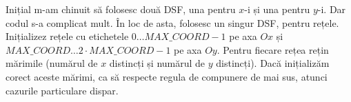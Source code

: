 Inițial m-am chinuit să folosesc două DSF, una pentru $x$-i și una pentru $y$-i. Dar codul s-a complicat mult. În loc de asta, folosesc un singur DSF, pentru rețele. Inițializez rețele cu etichetele $0 \dots MAX\_COORD-1$ pe axa $Ox$ și $MAX\_COORD \dots 2 \cdot MAX\_COORD - 1$ pe axa $Oy$. Pentru fiecare rețea rețin mărimile (numărul de $x$ distincți și numărul de $y$ distincți). Dacă inițializăm corect aceste mărimi, ca să respecte regula de compunere de mai sus, atunci cazurile particulare dispar.
